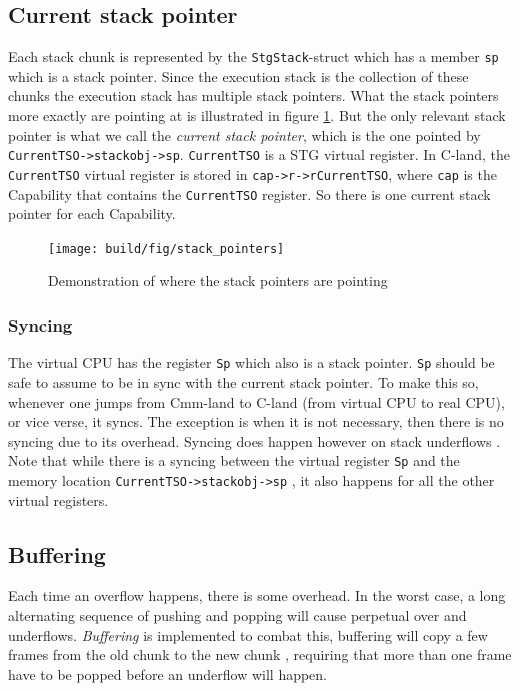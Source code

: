 \subsection{Current stack pointer}

Each stack chunk is represented by the \texttt{StgStack}-struct
which has a member \texttt{sp} which is a stack pointer.
Since the execution stack is the collection of these chunks the
execution stack has multiple stack pointers. What the stack
pointers more exactly are pointing at is illustrated in figure
\ref{fig:stack_pointers}. But the only relevant stack pointer is what
we call the \emph{current stack pointer}, which is the one pointed by
\texttt{CurrentTSO->stackobj->sp}. \texttt{CurrentTSO} is a STG virtual
register. In C-land, the \texttt{CurrentTSO} virtual register is stored
in \texttt{cap->r->rCurrentTSO}, where \texttt{cap} is the Capability
that contains the \texttt{CurrentTSO} register. So there is one current
stack pointer for each Capability.

\begin{figure}
\begin{mdframed}
  \texttt{[image: build/fig/stack\_pointers]}
  \caption{Demonstration of where the stack pointers are pointing}
  \label{fig:stack_pointers}
\end{mdframed}
\end{figure}

\subsubsection{Syncing}

The virtual CPU has the register \texttt{Sp} which also is a stack
pointer. \texttt{Sp} should be safe to assume to be in sync with
the current stack pointer. To make this so, whenever one jumps
from Cmm-land to C-land (from virtual CPU to real CPU), or vice
verse, it syncs. The exception is when it is not necessary, then there
is no syncing due to its overhead. Syncing does happen however on stack
underflows \cite{github_underflow_frame}. Note that while there is a
syncing between the virtual register \texttt{Sp} and the memory location
\texttt{CurrentTSO->stackobj->sp} \cite{github_sync_sp}, it also happens
for all the other virtual registers.

\subsection{Buffering}

Each time an overflow happens, there is some overhead. In the worst
case, a long alternating sequence of pushing and popping will cause
perpetual over and underflows. \emph{Buffering} is implemented to combat this,
buffering will copy a few frames from the old chunk to the new chunk
\cite{github_stack_buffering}, requiring that more than one frame have
to be popped before an underflow will happen.

